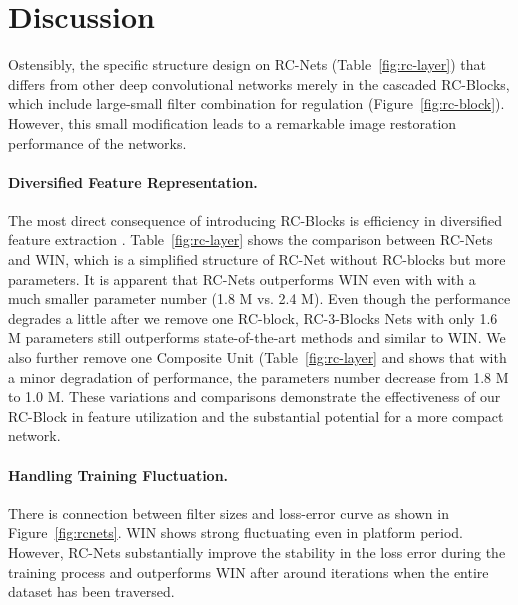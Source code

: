 \documentclass[10pt,twocolumn,letterpaper]{article}
\begin{document}
\section{Discussion}











Ostensibly, the specific structure design on RC-Nets (Table~\ref{fig:rc-layer}) that differs from other deep convolutional networks merely in the cascaded RC-Blocks, which include large-small filter combination for regulation (Figure~\ref{fig:rc-block}). However, this small modification leads to a remarkable image restoration performance of the networks.

\paragraph{Diversified Feature Representation.} The most direct consequence of introducing RC-Blocks is efficiency in diversified feature extraction . Table~\ref{fig:rc-layer} shows the comparison between RC-Nets and WIN, which is a simplified structure of RC-Net without RC-blocks but more parameters. It is apparent that RC-Nets outperforms WIN even with with a much smaller parameter number (1.8 M vs. 2.4 M). 
Even though the performance degrades a little after we remove one RC-block, RC-3-Blocks Nets with only 1.6 M  parameters still outperforms state-of-the-art methods and similar to WIN. We also further remove one Composite Unit (Table~\ref{fig:rc-layer} and shows that with a minor degradation of performance, the parameters number decrease from 1.8 M to 1.0 M. These variations and comparisons demonstrate the effectiveness of our RC-Block in feature utilization and the substantial potential for a more compact network. 



\paragraph{Handling Training Fluctuation.}  There is connection between filter sizes and loss-error curve as shown in Figure~\ref{fig:rcnets}. WIN shows strong fluctuating even in platform period. However, RC-Nets substantially improve the stability in the loss error during the training process and outperforms WIN after around  iterations when the entire dataset has been traversed. 
\end{document}
